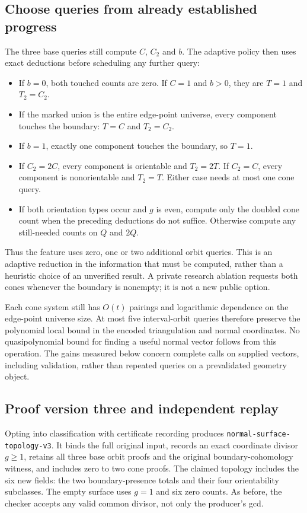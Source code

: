 \subsection{Choose queries from already established progress}

The three base queries still compute $C$, $C_2$ and $b$. The adaptive
policy then uses exact deductions before scheduling any further query:
\begin{itemize}
\item If $b=0$, both touched counts are zero. If $C=1$ and $b>0$,
      they are $T=1$ and $T_2=C_2$.
\item If the marked union is the entire edge-point universe, every
      component touches the boundary: $T=C$ and $T_2=C_2$.
\item If $b=1$, exactly one component touches the boundary, so $T=1$.
\item If $C_2=2C$, every component is orientable and $T_2=2T$.
      If $C_2=C$, every component is nonorientable and $T_2=T$.
      Either case needs at most one cone query.
\item If both orientation types occur and $g$ is even, compute only the
      doubled cone count when the preceding deductions do not suffice.
      Otherwise compute any still-needed counts on $Q$ and $2Q$.
\end{itemize}
Thus the feature uses zero, one or two additional orbit queries. This is
an adaptive reduction in the information that must be computed, rather
than a heuristic choice of an unverified result. A private research
ablation requests both cones whenever the boundary is nonempty; it is
not a new public option.

Each cone system still has $O(t)$ pairings and logarithmic dependence on
the edge-point universe size. At most five interval-orbit queries therefore
preserve the polynomial local bound in the encoded triangulation and
normal coordinates. No quasipolynomial bound for finding a useful normal
vector follows from this operation. The gains measured below concern
complete calls on supplied vectors, including validation, rather than
repeated queries on a prevalidated geometry object.

\subsection{Proof version three and independent replay}

Opting into classification with certificate recording produces
\texttt{normal-surface-topology-v3}. It binds the full original input,
records an exact coordinate divisor $g\ge1$, retains all three base
orbit proofs and the original boundary-cohomology witness, and includes
zero to two cone proofs. The claimed topology includes the six new fields:
the two boundary-presence totals and their four orientability subclasses.
The empty surface uses $g=1$ and six zero counts. As before, the checker
accepts any valid common divisor, not only the producer's gcd.

